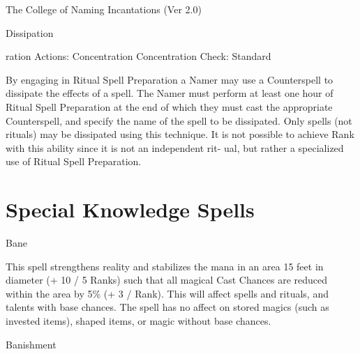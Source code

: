 \begin{Chapter}{The College of Naming Incantations (Ver 2.0)}
\begin{ritual}[Q-1]{Dissipation }


ration 
Actions: Concentration 
Concentration Check: Standard 
\begin{effects}
 By  engaging  in  Ritual  Spell  Preparation  a 
Namer  may  use  a  Counterspell  to  dissipate  the 
effects of a spell. The Namer must perform at least 
one  hour  of  Ritual  Spell  Preparation  at  the  end  of 
which they must cast the appropriate Counterspell, 
and specify the name of the spell to  be dissipated. 
Only  spells  (not  rituals)  may  be  dissipated  using 
this  technique.  It  is  not  possible  to  achieve  Rank 
with  this  ability  since  it  is  not  an  independent  rit-
ual,  but  rather  a  specialized  use  of  Ritual  Spell 
Preparation. 


\end{effects}
\end{ritual}

\section{Special Knowledge Spells}

\begin{spell}[S-1]{Bane }

\begin{effects}
This spell strengthens reality and stabilizes 
the  mana  in  an  area  15  feet  in  diameter  (+  10  /  5 
Ranks)  such  that  all  magical  Cast  Chances  are 
reduced  within  the  area  by  5\%  (+  3  /  Rank).  This 
will  affect  spells  and  rituals, and  talents  with  base 
chances.  The  spell  has  no  affect  on  stored  magics 
(such  as  invested  items),  shaped  items,  or  magic 
without base chances. 

\end{effects}
\end{spell}

\begin{spell}[S-2]{Banishment }


\end{spell}
\end{Chapter}
